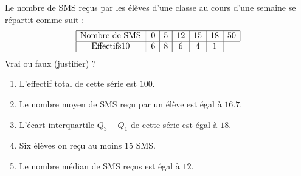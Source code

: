 
\begin{exercice}\label{exosmath-0530}

    Le nombre de SMS reçus par les élèves d'une classe au cours d'une semaine se répartit comme suit :
    \begin{equation*}
        \begin{array}[]{|c||c|c|c|c|c|c|}
            \hline
            \text{Nombre de SMS}&0&5&12&15&18&50\\
            \hline
            \text{Effectifs}10&6&8&6&4&1\\
            \hline
        \end{array}
    \end{equation*}
    Vrai ou faux (justifier) ?
    \begin{enumerate}
        \item
            L'effectif total de cette série est \( 100\).
        \item
            Le nombre moyen de SMS reçu par un élève est égal à \( 16.7\).
        \item
            L'écart interquartile \( Q_3-Q_1\) de cette série est égal à \( 18\).
        \item
            Six élèves on reçu au moins \( 15\) SMS.
        \item
            Le nombre médian de SMS reçus est égal à \( 12\).
    \end{enumerate}

\end{exercice}
